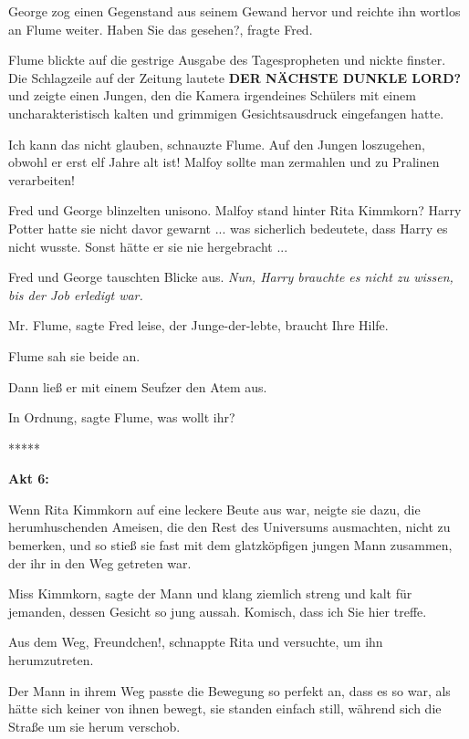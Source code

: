 George zog einen Gegenstand aus seinem Gewand hervor und reichte ihn wortlos an
Flume weiter. \glqq{}Haben Sie das gesehen?\grqq{}, fragte Fred.

Flume blickte auf die gestrige Ausgabe des Tagespropheten und nickte finster.
Die Schlagzeile auf der Zeitung lautete \textbf{DER NÄCHSTE DUNKLE LORD?} und
zeigte einen Jungen, den die Kamera irgendeines Schülers mit einem
uncharakteristisch kalten und grimmigen Gesichtsausdruck eingefangen hatte.

\glqq{}Ich kann das nicht glauben\grqq{}, schnauzte Flume. \glqq{}Auf den Jungen
loszugehen, obwohl er erst elf Jahre alt ist! Malfoy sollte man zermahlen und zu
Pralinen verarbeiten!\grqq{}

Fred und George blinzelten unisono. Malfoy stand hinter Rita Kimmkorn? Harry
Potter hatte sie nicht davor gewarnt ... was sicherlich bedeutete, dass Harry es
nicht wusste. Sonst hätte er sie nie hergebracht ...

Fred und George tauschten Blicke aus. \emph{Nun, Harry brauchte es nicht zu
wissen, bis der Job erledigt war.}

\glqq{}Mr. Flume\grqq{}, sagte Fred leise, \glqq{}der Junge-der-lebte, braucht
Ihre Hilfe.\grqq{}

Flume sah sie beide an.

Dann ließ er mit einem Seufzer den Atem aus.

\glqq{}In Ordnung\grqq{}, sagte Flume, \glqq{}was wollt ihr?\grqq{}

\begin{center}*****\end{center}

\textbf{Akt 6:}

Wenn Rita Kimmkorn auf eine leckere Beute aus war, neigte sie dazu, die
herumhuschenden Ameisen, die den Rest des Universums ausmachten, nicht zu
bemerken, und so stieß sie fast mit dem glatzköpfigen jungen Mann zusammen, der
ihr in den Weg getreten war.

\glqq{}Miss Kimmkorn\grqq{}, sagte der Mann und klang ziemlich streng und kalt
für jemanden, dessen Gesicht so jung aussah. \glqq{}Komisch, dass ich Sie hier
treffe.\grqq{}

\glqq{}Aus dem Weg, Freundchen!\grqq{}, schnappte Rita und versuchte, um ihn
herumzutreten.

Der Mann in ihrem Weg passte die Bewegung so perfekt an, dass es so war, als
hätte sich keiner von ihnen bewegt, sie standen einfach still, während sich die
Straße um sie herum verschob.

